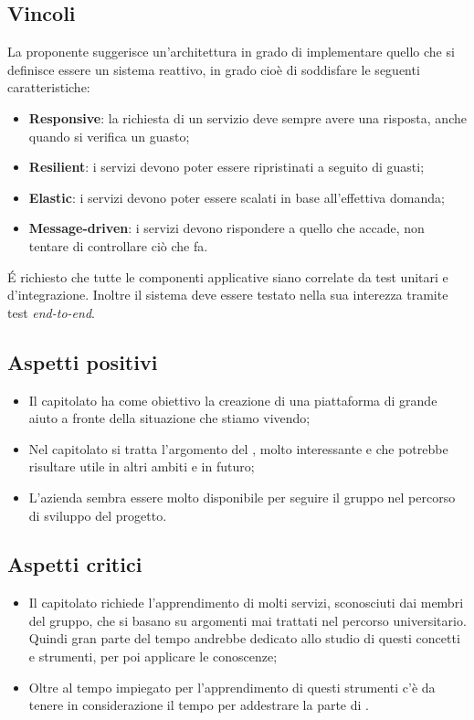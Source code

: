 \subsection{Vincoli}
La proponente suggerisce un'architettura in grado di implementare quello che si definisce essere un sistema reattivo, in grado cioè di soddisfare le seguenti caratteristiche: 
\begin{itemize}
\item \textbf{Responsive}: la richiesta di un servizio deve sempre avere una risposta, anche quando si verifica un guasto; 
\item \textbf{Resilient}: i servizi devono poter essere ripristinati a seguito di guasti; 
\item \textbf{Elastic}: i servizi devono poter essere scalati in base all'effettiva domanda; 
\item \textbf{Message-driven}: i servizi devono rispondere a quello che accade, non tentare di controllare ciò che fa.  
\end{itemize}
\'E richiesto che tutte le componenti applicative siano correlate da test unitari e d’integrazione. Inoltre il sistema deve essere testato nella sua interezza tramite test \textit{end-to-end}. 

\subsection{Aspetti positivi}
\begin{itemize}
\item Il capitolato ha come obiettivo la creazione di una piattaforma di grande aiuto a fronte della situazione che stiamo vivendo;
\item Nel capitolato si tratta l'argomento del , molto interessante e che potrebbe risultare utile in altri ambiti e in futuro;
\item L'azienda sembra essere molto disponibile per seguire il gruppo nel percorso di sviluppo del progetto.
\end{itemize}

\subsection{Aspetti critici}
\begin{itemize}
\item Il capitolato richiede l'apprendimento di molti servizi, sconosciuti dai membri del gruppo, che si basano su argomenti mai trattati nel percorso universitario. Quindi gran parte del tempo andrebbe dedicato allo studio di questi concetti e strumenti, per poi applicare le conoscenze;
\item Oltre al tempo impiegato per l'apprendimento di questi strumenti c'è da tenere in considerazione il tempo per addestrare la parte di .
\end{itemize}

